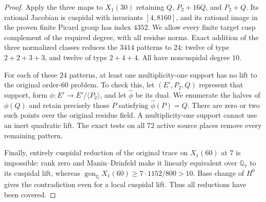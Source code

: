 \begin{proof}
Apply the three maps to $X_1(30)$ retaining
$Q$, $P_2+16Q$, and $P_2+Q$.
Its rational Jacobian is cuspidal with invariants $[4,8160]$, and
its rational image in the proven finite Picard group has index
$4352$. We allow every finite target cusp complement of the
required degree, with all residue norms.
Exact addition of the three normalized classes reduces the
$3414$ patterns to $24$: twelve of type $2+2+3+3$, and twelve of
type $2+4+4$. All have noncuspidal degree $10$.

For each of these $24$ patterns, at least one multiplicity-one
support has no lift to the original order-$60$ problem.
To check this, let $(E',P_2,Q)$ represent that support, form
$\phi:E'\to E'/\langle P_2\rangle$, and let $\widehat\phi$ be
its dual. We enumerate the halves of $\phi(Q)$ and retain precisely
those $P$ satisfying $\widehat\phi(P)=Q$.
There are zero or two such points over the original residue field.
A multiplicity-one support cannot use an inert quadratic lift.
The exact tests on all $72$ active source places remove every
remaining pattern.

Finally, entirely cuspidal reduction of the original trace on
$X_1(60)$ at $7$ is impossible: rank zero and Manin--Drinfeld make
it linearly equivalent over $\mathbb Q_7$ to its cuspidal lift,
whereas
$\operatorname{gon}_{\mathbb Q}X_1(60)\geq7\cdot1152/800>10$.
Base change of $H^0$ gives the contradiction even for a local
cuspidal lift. Thus all reductions have been covered.
\end{proof}
